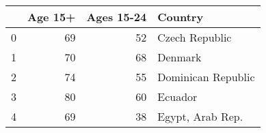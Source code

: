 \begin{tabular}{lrrl}
\toprule
 & Age 15+ & Ages 15-24 & Country \\
\midrule
0 & 69 & 52 & Czech Republic \\
1 & 70 & 68 & Denmark \\
2 & 74 & 55 & Dominican Republic \\
3 & 80 & 60 & Ecuador \\
4 & 69 & 38 & Egypt, Arab Rep. \\
\bottomrule
\end{tabular}
